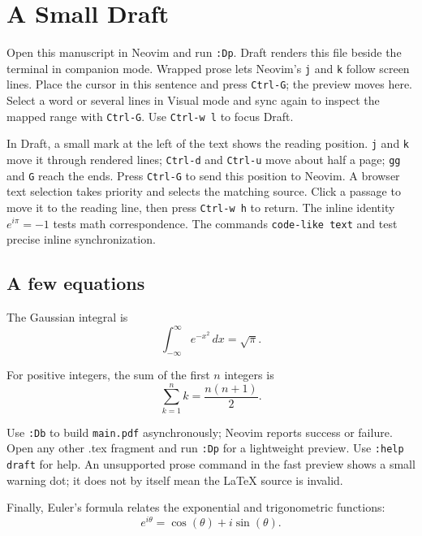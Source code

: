\documentclass{article}
\begin{document}
\section{A Small Draft}

Open this manuscript in Neovim and run \texttt{:Dp}. Draft renders this file
beside the terminal in companion mode. Wrapped prose
lets Neovim's \texttt{j} and \texttt{k} follow screen lines. Place the cursor
in this sentence and press \texttt{Ctrl-G}; the preview moves here. Select
a word or several lines in Visual mode and sync again to inspect the mapped
range with \texttt{Ctrl-G}. Use \texttt{Ctrl-w l} to focus Draft.

In Draft, a small mark at the left of the text shows the reading position.
\texttt{j} and \texttt{k} move it through rendered lines; \texttt{Ctrl-d}
and \texttt{Ctrl-u} move about half a page; \texttt{gg} and \texttt{G}
reach the ends. Press \texttt{Ctrl-G} to send this position to Neovim.
A browser text selection takes priority and selects the matching source.
Click a passage to move it to the reading line, then press \texttt{Ctrl-w h}
to return. The inline identity $e^{i\pi} = -1$ tests math correspondence.
The commands \texttt{code-like text} and  test precise
inline synchronization.

\subsection{A few equations}

The Gaussian integral is
\[
  \int_{-\infty}^{\infty} e^{-x^2}\,dx = \sqrt{\pi}.
\]

For positive integers, the sum of the first $n$ integers is
\[
  \sum_{k=1}^{n} k = \frac{n(n+1)}{2}.
\]

Use \texttt{:Db} to build \texttt{main.pdf} asynchronously; Neovim reports
success or failure. Open any other .tex fragment and run
\texttt{:Dp} for a lightweight preview. Use \texttt{:help draft} for help.
An unsupported prose command in the fast preview shows a small warning dot;
it does not by itself mean the LaTeX source is invalid.

Finally, Euler's formula relates the exponential and trigonometric functions:
\[
  e^{i\theta} = \cos(\theta) + i\sin(\theta).
\]
\end{document}
